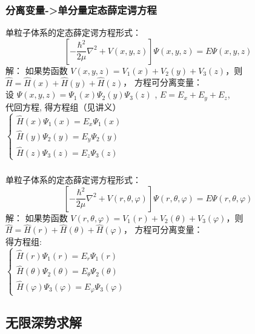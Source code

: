 \begin{frame}
	\frametitle{分离变量->单分量定态薛定谔方程}
	单粒子体系的定态薛定谔方程形式：   
	\begin{equation*}
		\left [ -\dfrac{\hbar^2}{2\mu }\nabla ^2 + V(x,y,z) \right ]\Psi (x,y,z) =E \Psi (x,y,z)  
	\end{equation*}		
	\alert{解：} 	如果势函数 $ V(x,y,z)=V_1(x)+V_2(y)+V_3(z) $，则  $ \hat{H}=\hat{H}(x)+\hat{H}(y)+\hat{H}(z) $， 方程可分离变量：\\
	设  $\Psi (x,y,z)   = \Psi_1 (x)\Psi_2 (y) \Psi_3 (z)  $ , $E  = E_x+ E_y+E_z $, \\
	代回方程, 得方程组（见讲义）\\
	$\displaystyle \begin{cases}
		\hat{H}(x)\Psi_1 (x)=E_x \Psi_1 (x) \\
		\hat{H}(y)\Psi _2 (y)=E_y \Psi _2 (y)  \\
		\hat{H}(z)\Psi _3 (z)=E_z \Psi _3 (z) 
	\end{cases}$ \\	
\end{frame}

\begin{frame}
	\frametitle{}
	单粒子体系的定态薛定谔方程形式：   
	\begin{equation*}
		\left [ -\dfrac{\hbar^2}{2\mu }\nabla ^2 + V(r,\theta,\varphi) \right ]\Psi (r,\theta,\varphi) =E \Psi (r,\theta,\varphi)  
	\end{equation*}		
	\alert{解：} 	如果势函数 $ V(r,\theta,\varphi) =V_1(r)+V_2(\theta)+V_3(\varphi) $，则  $ \hat{H}=\hat{H}(r)+\hat{H}(\theta)+\hat{H}(\varphi) $， 方程可分离变量：\\
	得方程组:\\
	$\displaystyle \begin{cases}
		\hat{H}(r)\Psi_1 (r)=E_r \Psi_1 (r) \\
		\hat{H}(\theta)\Psi _2 (\theta)=E_\theta \Psi _2 (\theta)  \\
		\hat{H}(\varphi)\Psi _3 (\varphi)=E_\varphi \Psi _3 (\varphi) 
	\end{cases}$ \\	
\end{frame}

\subsection{无限深势求解}

